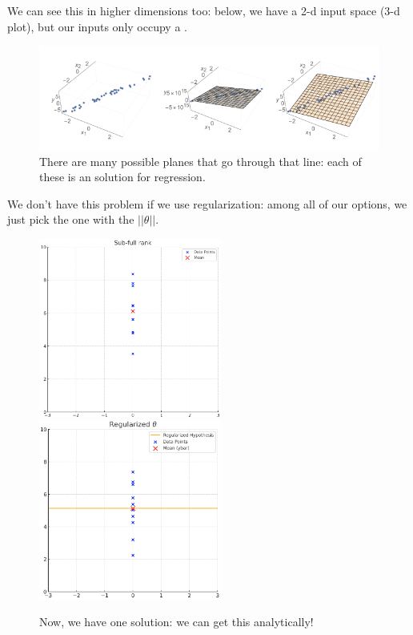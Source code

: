 
        We can see this in higher dimensions too: below, we have a 2-d input space (3-d plot), but our inputs only occupy a .

        \begin{figure}[H]
        \centering
            \includegraphics[width=120mm,scale=0.5]{images/regression_images/Regularizer_Multiple_Solutions.png}
        
            \caption*{There are many possible planes that go through that line: each of these is an  solution for regression.}
        \end{figure}

        \phantom{}

        We don't have this problem if we use regularization: among all of our  options, we just pick the one with the  $||\theta||$.

        \begin{figure}[H]
        \centering
            \includegraphics[width=60mm,scale=0.5]{images/regression_images/sub_full_rank.png}
            \includegraphics[width=60mm,scale=0.5]{images/regression_images/singular_data_regularized.png}
            \caption*{Now, we have one solution: we can get this analytically!}
        \end{figure}
            

